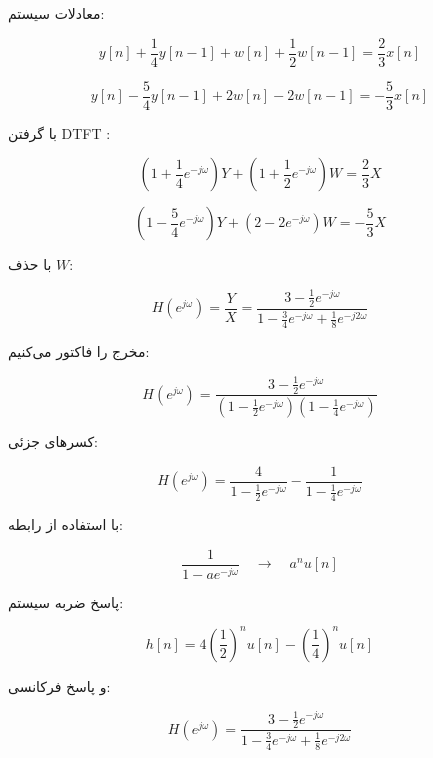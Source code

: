 معادلات سیستم:

\[
y[n]+\frac14 y[n-1]+w[n]+\frac12 w[n-1]=\frac23 x[n]
\]

\[
y[n]-\frac54 y[n-1]+2w[n]-2w[n-1]=-\frac53 x[n]
\]

با گرفتن DTFT :

\[
\left(1+\frac14 e^{-j\omega}\right)Y
+
\left(1+\frac12 e^{-j\omega}\right)W
=
\frac23 X
\]

\[
\left(1-\frac54 e^{-j\omega}\right)Y
+
\left(2-2e^{-j\omega}\right)W
=
-\frac53 X
\]

با حذف \(W\):

\[
H(e^{j\omega})=\frac{Y}{X}
=
\frac{
3-\frac12 e^{-j\omega}
}{
1-\frac34 e^{-j\omega}+\frac18 e^{-j2\omega}
}
\]

مخرج را فاکتور می‌کنیم:

\[
H(e^{j\omega})
=
\frac{
3-\frac12 e^{-j\omega}
}{
\left(1-\frac12 e^{-j\omega}\right)
\left(1-\frac14 e^{-j\omega}\right)
}
\]

کسرهای جزئی:

\[
H(e^{j\omega})
=
\frac{4}{1-\frac12 e^{-j\omega}}
-
\frac{1}{1-\frac14 e^{-j\omega}}
\]

با استفاده از رابطه:

\[
\frac{1}{1-ae^{-j\omega}}
\quad \longrightarrow \quad
a^n u[n]
\]

پاسخ ضربه سیستم:

\[
{
h[n]
=
4\left(\frac12\right)^n u[n]
-
\left(\frac14\right)^n u[n]
}
\]

و پاسخ فرکانسی:

\[
{
H(e^{j\omega})
=
\frac{
3-\frac12 e^{-j\omega}
}{
1-\frac34 e^{-j\omega}+\frac18 e^{-j2\omega}
}
}
\]
